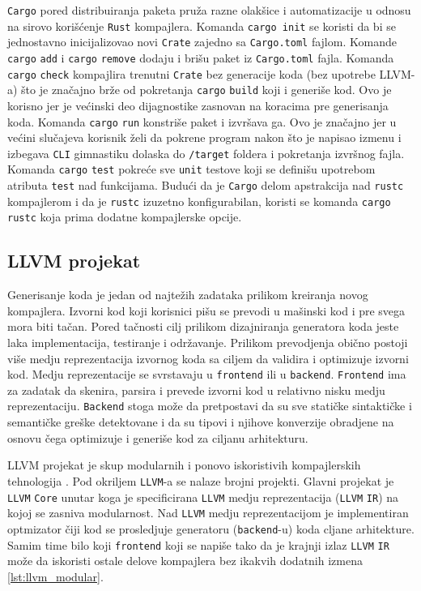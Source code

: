 \documentclass[11pt]{article}
\begin{document}
\verb|Cargo| pored distribuiranja paketa pruža razne olakšice i automatizacije u odnosu na sirovo korišćenje \verb|Rust| kompajlera. 
Komanda \verb|cargo init| se koristi da bi se jednostavno inicijalizovao novi \verb|Crate| zajedno sa \verb|Cargo.toml| fajlom. 
Komande \verb|cargo| \verb|add| i \verb|cargo| \verb|remove| dodaju i brišu paket iz \verb|Cargo.toml| fajla.
Komanda \verb|cargo| \verb|check| kompajlira trenutni \verb|Crate| bez generacije koda (bez upotrebe LLVM-a) što je značajno brže 
od pokretanja \verb|cargo| \verb|build| koji i generiše kod. Ovo je korisno jer je većinski deo dijagnostike zasnovan 
na koracima pre generisanja koda. Komanda \verb|cargo| \verb|run| konstriše paket i izvršava ga. Ovo je značajno jer u većini slučajeva korisnik želi da pokrene program nakon što je 
napisao izmenu i izbegava \verb|CLI| gimnastiku dolaska do \verb|/target| foldera i pokretanja izvršnog fajla. 
Komanda \verb|cargo| \verb|test| pokreće sve \verb|unit| testove koji se definišu upotrebom atributa \verb|test| nad funkcijama.
Budući da je \verb|Cargo| delom apstrakcija nad \verb|rustc| kompajlerom i da je \verb|rustc| izuzetno konfigurabilan, koristi se komanda \verb|cargo| \verb|rustc|
koja prima dodatne kompajlerske opcije.

\newpage

\subsection{LLVM projekat}

Generisanje koda je jedan od najtežih zadataka prilikom kreiranja novog kompajlera. Izvorni kod koji 
korisnici pišu se prevodi u mašinski kod i pre svega mora biti tačan. Pored tačnosti cilj prilikom 
dizajniranja generatora koda jeste laka implementacija, testiranje i održavanje.
Prilikom prevodjenja obično postoji 
više medju reprezentacija izvornog koda sa ciljem da validira i optimizuje izvorni kod. Medju reprezentacije 
se svrstavaju u \verb|frontend| ili u \verb|backend|. \verb|Frontend| ima za zadatak da skenira, parsira 
i prevede izvorni kod u relativno nisku medju reprezentaciju. \verb|Backend| stoga može da pretpostavi 
da su sve statičke sintaktičke i semantičke greške detektovane i da su tipovi i njihove konverzije
obradjene na osnovu čega optimizuje i generiše kod za ciljanu arhitekturu.

LLVM projekat je skup modularnih i ponovo iskoristivih kompajlerskih tehnologija \cite{llvm}. Pod okriljem \verb|LLVM|-a
se nalaze brojni projekti. Glavni projekat je \verb|LLVM| \verb|Core| unutar koga je specificirana \verb|LLVM|
medju reprezentacija (\verb|LLVM| \verb|IR|) na kojoj se zasniva modularnost. Nad \verb|LLVM| medju reprezentacijom
je implementiran optmizator čiji kod se prosledjuje generatoru (\verb|backend|-u) koda cljane arhitekture. Samim time 
bilo koji \verb|frontend| koji se napiše tako da je krajnji izlaz \verb|LLVM| \verb|IR| može da iskoristi 
ostale delove kompajlera bez ikakvih dodatnih izmena \ref{lst:llvm_modular}.
\end{document}
